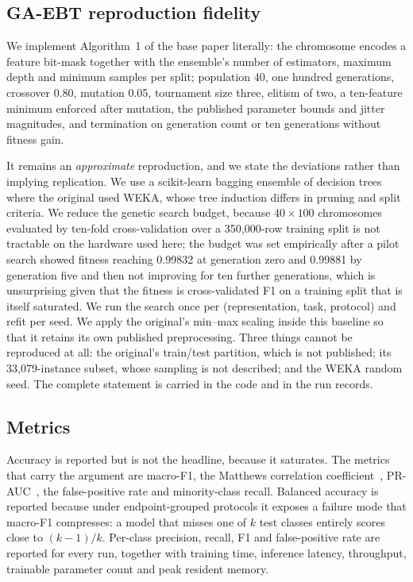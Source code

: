 \subsection{GA-EBT reproduction fidelity}

We implement Algorithm~1 of the base paper literally: the chromosome encodes a
feature bit-mask together with the ensemble's number of estimators, maximum
depth and minimum samples per split; population 40, one hundred generations,
crossover 0.80, mutation 0.05, tournament size three, elitism of two, a
ten-feature minimum enforced after mutation, the published parameter bounds and
jitter magnitudes, and termination on generation count or ten generations
without fitness gain.

It remains an \emph{approximate} reproduction, and we state the deviations
rather than implying replication. We use a scikit-learn bagging ensemble of
decision trees where the original used WEKA, whose tree induction differs in
pruning and split criteria. We reduce the genetic search budget, because
$40 \times 100$ chromosomes evaluated by ten-fold cross-validation over a
350{,}000-row training split is not tractable on the hardware used here; the
budget was set empirically after a pilot search showed fitness reaching 0.99832
at generation zero and 0.99881 by generation five and then not improving for
ten further generations, which is unsurprising given that the fitness is
cross-validated F1 on a training split that is itself saturated. We run the
search once per (representation, task, protocol) and refit per seed. We apply
the original's min--max scaling inside this baseline so that it retains its own
published preprocessing. Three things cannot be reproduced at all: the
original's train/test partition, which is not published; its 33{,}079-instance
subset, whose sampling is not described; and the WEKA random seed. The complete
statement is carried in the code and in the run records.

\subsection{Metrics}

Accuracy is reported but is not the headline, because it saturates. The metrics
that carry the argument are macro-F1, the Matthews correlation
coefficient~\cite{chicco2020mcc}, PR-AUC~\cite{saito2015prcurve}, the
false-positive rate and minority-class recall. Balanced accuracy is reported
because under endpoint-grouped protocols it exposes a failure mode that macro-F1
compresses: a model that misses one of $k$ test classes entirely scores close to
$(k-1)/k$. Per-class precision, recall, F1 and false-positive rate are reported
for every run, together with training time, inference latency, throughput,
trainable parameter count and peak resident memory.

